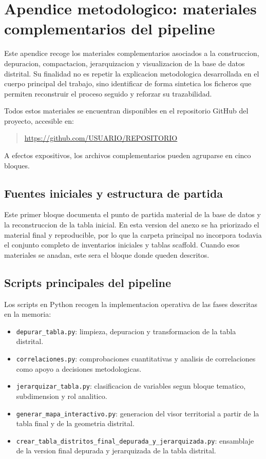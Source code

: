 \chapter{Apendice metodologico: materiales complementarios del pipeline}

Este apendice recoge los materiales complementarios asociados a la construccion, depuracion, compactacion, jerarquizacion y visualizacion de la base de datos distrital. Su finalidad no es repetir la explicacion metodologica desarrollada en el cuerpo principal del trabajo, sino identificar de forma sintetica los ficheros que permiten reconstruir el proceso seguido y reforzar su trazabilidad.

Todos estos materiales se encuentran disponibles en el repositorio GitHub del proyecto, accesible en:
\begin{quote}
\url{https://github.com/USUARIO/REPOSITORIO}
\end{quote}

A efectos expositivos, los archivos complementarios pueden agruparse en cinco bloques.

\section{Fuentes iniciales y estructura de partida}

Este primer bloque documenta el punto de partida material de la base de datos y la reconstruccion de la tabla inicial. En esta version del anexo se ha priorizado el material final y reproducible, por lo que la carpeta principal no incorpora todavia el conjunto completo de inventarios iniciales y tablas scaffold. Cuando esos materiales se anadan, este sera el bloque donde queden descritos.

\section{Scripts principales del pipeline}

Los scripts en Python recogen la implementacion operativa de las fases descritas en la memoria:

\begin{itemize}
    \item \texttt{depurar\_tabla.py}: limpieza, depuracion y transformacion de la tabla distrital.
    \item \texttt{correlaciones.py}: comprobaciones cuantitativas y analisis de correlaciones como apoyo a decisiones metodologicas.
    \item \texttt{jerarquizar\_tabla.py}: clasificacion de variables segun bloque tematico, subdimension y rol analitico.
    \item \texttt{generar\_mapa\_interactivo.py}: generacion del visor territorial a partir de la tabla final y de la geometria distrital.
    \item \texttt{crear\_tabla\_distritos\_final\_depurada\_y\_jerarquizada.py}: ensamblaje de la version final depurada y jerarquizada de la tabla distrital.
\end{itemize}

